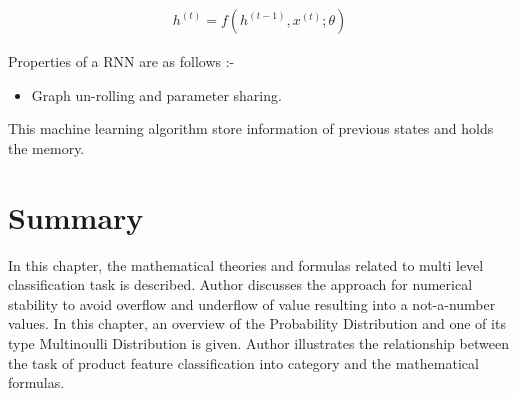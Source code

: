\begin{align}
    h^{(t)} = f(h^{(t-1)}, x^{(t)}; \theta)
 \end{align}

Properties of a RNN are as follows \parencite[Chapter 10]{Goodfellow-et-al-2016}:- 
\begin{itemize}
    \item Graph un-rolling and parameter sharing.
    

    


\end{itemize}

This machine learning algorithm store information of previous states and holds the memory. 




\section{Summary}

In this chapter, the mathematical theories and formulas related to multi level classification task is described. Author discusses the approach for numerical stability to avoid overflow and underflow of value resulting into a not-a-number values. In this chapter, an overview of the Probability Distribution and one of its type Multinoulli Distribution is given. Author illustrates the relationship between the task of product feature classification into category and the mathematical formulas.  